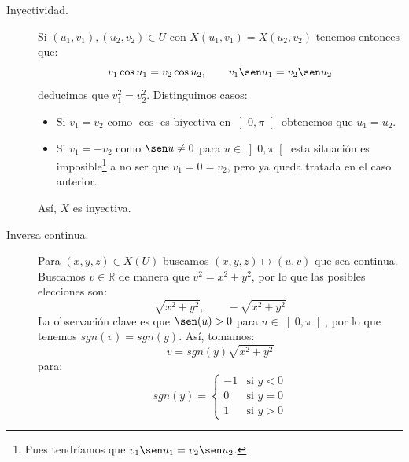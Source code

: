 \documentclass[12pt]{article}
\begin{document}
\begin{ejercicio}
\begin{enumerate}[label=\alph*)]
                \begin{description}
                    \item [Inyectividad.] Si $(u_1,v_1),(u_2,v_2)\in U$ con $X(u_1,v_1) = X(u_2,v_2)$ tenemos entonces que:
                        \begin{equation*}
                            v_1\cos u_1 = v_2\cos u_2, \qquad v_1\sen u_1 = v_2\sen u_2
                        \end{equation*}
                        deducimos que $v_1^2 = v_2^2$. Distinguimos casos:
                        \begin{itemize}
                            \item Si $v_1=v_2$ como $\cos$ es biyectiva en $\left]0,\pi\right[$ obtenemos que $u_1 = u_2$.
                            \item Si $v_1=-v_2$ como $\sen u\neq 0$ para $u \in \left]0,\pi\right[$ esta situación es imposible\footnote{Pues tendríamos que $v_1\sen u_1 = v_2\sen u_2$.} a no ser que $v_1 = 0 = v_2$, pero ya queda tratada en el caso anterior.
                        \end{itemize}
                        Así, $X$ es inyectiva.
                    \item [Inversa continua.] Para $(x,y,z)\in X(U)$ buscamos $(x,y,z)\mapsto (u,v)$ que sea continua. Buscamos $v\in \mathbb{R}$ de manera que $v^2 = x^2+y^2$, por lo que las posibles elecciones son:
                        \begin{equation*}
                            \sqrt{x^2+y^2}, \qquad -\sqrt{x^2+y^2}
                        \end{equation*}
                        La observación clave es que $\sen(u)>0$ para $u\in \left]0,\pi\right[$, por lo que tenemos $sgn(v) = sgn(y)$. Así, tomamos:
                        \begin{equation*}
                            v = sgn(y)\sqrt{x^2+y^2}
                        \end{equation*}
                        para:
                        \begin{equation*}
                            sgn(y) = \left\{\begin{array}{ll}
                                -1 & \text{si\ } y<0 \\
                                0 & \text{si\ } y=0\\
                                1 & \text{si\ } y>0
                            \end{array}\right. 

\end{equation*}
\end{description}
\end{enumerate}
\end{ejercicio}
\end{document}
